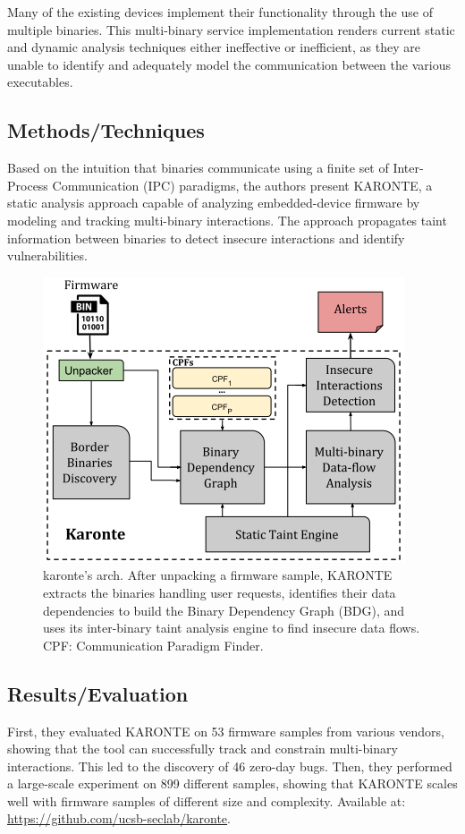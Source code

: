 Many of the existing devices implement their functionality through the use of multiple binaries. This multi-binary service implementation renders current static and dynamic analysis techniques either ineffective or inefficient, as they are unable to identify and adequately model the communication between the various executables.
\subsection{Methods/Techniques}
Based on the intuition that binaries communicate using a finite set of Inter-Process Communication (IPC) paradigms, the authors present KARONTE, a static analysis approach capable of analyzing embedded-device firmware by modeling and tracking multi-binary interactions.  The approach propagates taint information between binaries to detect insecure interactions and identify vulnerabilities.
\begin{figure}[h]
    \centering
    \includegraphics[width=0.7\linewidth]{karonte.png} %
    \caption{karonte's arch.  After unpacking a firmware sample, KARONTE extracts the binaries handling user requests, identifies their data dependencies to build the Binary Dependency Graph (BDG), and uses its inter-binary taint analysis engine to find insecure data flows. CPF: Communication Paradigm Finder.}	
    \label{fig:karonte}
\end{figure}
\subsection{Results/Evaluation}
First, they evaluated KARONTE on 53 firmware samples from various vendors, showing that the tool can successfully track and constrain multi-binary interactions. This led to the discovery of 46 zero-day bugs. Then, they performed a large-scale experiment on 899 different samples, showing that KARONTE scales well with firmware samples of different size and complexity. Available at: \url{https://github.com/ucsb-seclab/karonte}.
